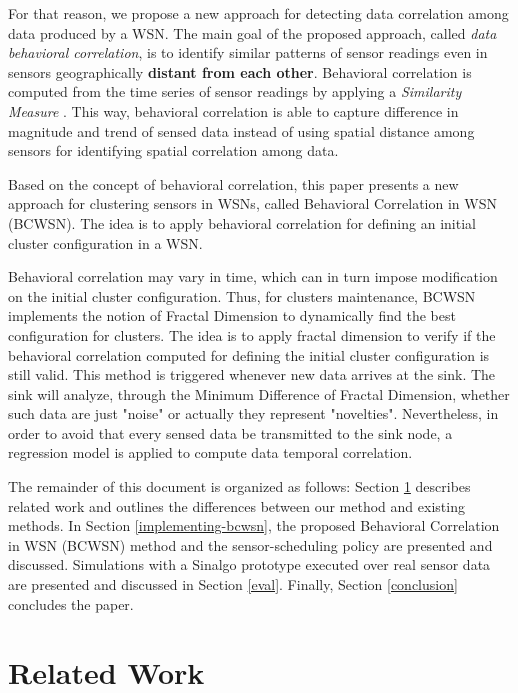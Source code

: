 \documentclass{acm_proc_article-sp}
\begin{document}
For that reason, we propose a new approach for detecting data correlation among
data produced by a WSN. The main goal of the proposed approach, called  {\it
data behavioral correlation}, is to identify similar patterns of sensor readings
even in sensors geographically \textbf{distant from each other}. Behavioral
correlation is computed from the time series of sensor readings by applying a {\it
Similarity Measure} \cite{Liu2007}. This way, behavioral correlation is able to
capture difference in magnitude and trend of sensed data instead of using
spatial distance among sensors for identifying spatial correlation among data.

Based on the concept of behavioral correlation, this paper presents a new
approach for clustering sensors in WSNs, called Behavioral Correlation in WSN
(BCWSN). The idea is to apply behavioral correlation for defining an initial
cluster configuration in a WSN.

Behavioral correlation may vary in time, which can in turn impose modification
on the initial cluster configuration. Thus, for clusters maintenance, BCWSN
implements the notion of Fractal Dimension to dynamically find the best
configuration for clusters. The idea is to apply fractal dimension to verify if
the behavioral correlation computed for defining the initial cluster
configuration is still valid. This method is triggered whenever new data arrives
at the sink.
The sink will analyze, through the Minimum Difference of Fractal Dimension,
whether such data are just "noise" or actually they represent "novelties". 
Nevertheless, in order to avoid that every sensed data be transmitted to the
sink node, a regression model is applied to compute data temporal correlation.
\vspace*{-.3cm}

The remainder of this document is organized as follows: Section
\ref{related-work} describes related work and outlines the differences between
our method and existing methods. In Section \ref{implementing-bcwsn}, the
proposed Behavioral Correlation in WSN (BCWSN) method and the sensor-scheduling
policy are presented and discussed. Simulations with a Sinalgo
\cite{Sinalgo2007} prototype executed over real sensor data are presented and
discussed in Section \ref{eval}. Finally, Section \ref{conclusion} concludes the
paper.


\section{Related Work}
\label{related-work}
\end{document}
